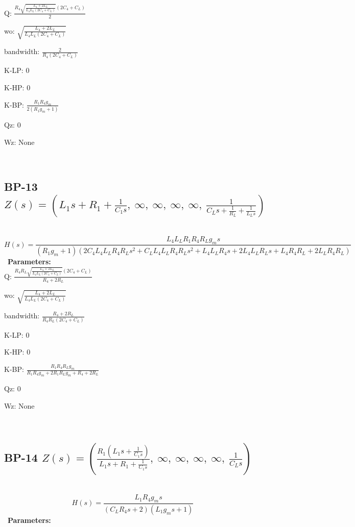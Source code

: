 \documentclass{article}
\begin{document}
Q: $\frac{R_{4} \sqrt{\frac{L_{4} + 2 L_{L}}{L_{4} L_{L} \left(2 C_{4} + C_{L}\right)}} \left(2 C_{4} + C_{L}\right)}{2}$\ 

wo: $\sqrt{\frac{L_{4} + 2 L_{L}}{L_{4} L_{L} \left(2 C_{4} + C_{L}\right)}}$\ 

bandwidth: $\frac{2}{R_{4} \left(2 C_{4} + C_{L}\right)}$\ 

K-LP: $0$\ 

K-HP: $0$\ 

K-BP: $\frac{R_{1} R_{4} g_{m}}{2 \left(R_{1} g_{m} + 1\right)}$\ 

Qz: $0$\ 

Wz: $\text{None}$\ 

\ 

\subsection{BP-13 $Z(s) = \left( L_{1} s + R_{1} + \frac{1}{C_{1} s}, \  \infty, \  \infty, \  \infty, \  \infty, \  \frac{1}{C_{L} s + \frac{1}{R_{L}} + \frac{1}{L_{L} s}}\right)$ } \ 
\textbf{\[H(s) = \frac{L_{4} L_{L} R_{1} R_{4} R_{L} g_{m} s}{\left(R_{1} g_{m} + 1\right) \left(2 C_{4} L_{4} L_{L} R_{4} R_{L} s^{2} + C_{L} L_{4} L_{L} R_{4} R_{L} s^{2} + L_{4} L_{L} R_{4} s + 2 L_{4} L_{L} R_{L} s + L_{4} R_{4} R_{L} + 2 L_{L} R_{4} R_{L}\right)}\] } \ 
\textbf{Parameters:}\\ 

Q: $\frac{R_{4} R_{L} \sqrt{\frac{L_{4} + 2 L_{L}}{L_{4} L_{L} \left(2 C_{4} + C_{L}\right)}} \left(2 C_{4} + C_{L}\right)}{R_{4} + 2 R_{L}}$\ 

wo: $\sqrt{\frac{L_{4} + 2 L_{L}}{L_{4} L_{L} \left(2 C_{4} + C_{L}\right)}}$\ 

bandwidth: $\frac{R_{4} + 2 R_{L}}{R_{4} R_{L} \left(2 C_{4} + C_{L}\right)}$\ 

K-LP: $0$\ 

K-HP: $0$\ 

K-BP: $\frac{R_{1} R_{4} R_{L} g_{m}}{R_{1} R_{4} g_{m} + 2 R_{1} R_{L} g_{m} + R_{4} + 2 R_{L}}$\ 

Qz: $0$\ 

Wz: $\text{None}$\ 

\ 

\subsection{BP-14 $Z(s) = \left( \frac{R_{1} \left(L_{1} s + \frac{1}{C_{1} s}\right)}{L_{1} s + R_{1} + \frac{1}{C_{1} s}}, \  \infty, \  \infty, \  \infty, \  \infty, \  \frac{1}{C_{L} s}\right)$ } \ 
\textbf{\[H(s) = \frac{L_{1} R_{4} g_{m} s}{\left(C_{L} R_{4} s + 2\right) \left(L_{1} g_{m} s + 1\right)}\] } \ 
\textbf{Parameters:}\\ 
\end{document}
